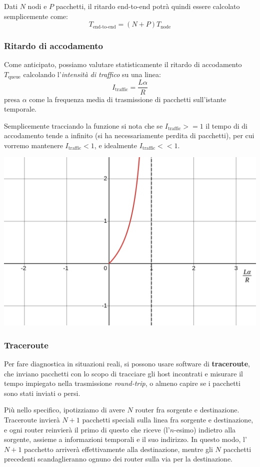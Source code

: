 \documentclass[a4paper,11pt]{article}
\begin{document}
Dati $N$ nodi e $P$ pacchetti, il ritardo end-to-end potrà quindi essere calcolato semplicemente come:
$$
T_{\text{end-to-end}} = (N + P) T_{\text{node}}
$$

\subsubsection{Ritardo di accodamento}
Come anticipato, possiamo valutare statisticamente il ritardo di accodamento $T_{\text{queue}}$ calcolando l'\textit{intensità di traffico} su una linea:
$$
I_{\text{traffic}} = \frac{L \alpha}{R}
$$
presa $\alpha$ come la frequenza media di trasmissione di pacchetti sull'istante temporale.

Semplicemente tracciando la funzione si nota che se $I_{\text{traffic}} >= 1$ il tempo di di accodamento tende a infinito (si ha necessariamente perdita di pacchetti), per cui vorremo mantenere $I_{\text{traffic}} < 1$, e idealmente $I_{\text{traffic}} << 1$.

\begin{center}
	\includegraphics[scale=0.3]{../figures/traf_intensity.png}
\end{center}

\subsubsection{Traceroute}
Per fare diagnostica in situazioni reali, si possono usare software di \textbf{traceroute}, che inviano pacchetti con lo scopo di tracciare gli host incontrati e misurare il tempo impiegato nella trasmissione \textit{round-trip}, o almeno capire se i pacchetti sono stati inviati o persi.

Più nello specifico, ipotizziamo di avere $N$ router fra sorgente e destinazione.
Traceroute invierà $N + 1$ pacchetti speciali sulla linea fra sorgente e destinazione, e ogni router reinvierà il primo di questo che riceve (l'$n$-esimo) indietro alla sorgente, assieme a informazioni temporali e il suo indirizzo.
In questo modo, l'$N + 1$ pacchetto arriverà effettivamente alla destinazione, mentre gli $N$ pacchetti precedenti scandaglieranno ognuno dei router sulla via per la destinazione.
\end{document}
